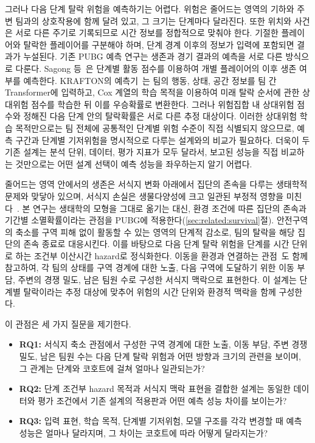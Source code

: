 그러나 다음 단계 탈락 위험을 예측하기는 어렵다.
위험은 줄어드는 영역의 기하와 주변 팀과의 상호작용에 함께 달려 있고, 그 크기는 단계마다 달라진다.
또한 위치와 사건은 서로 다른 주기로 기록되므로 시간 정보를 정합적으로 맞춰야 한다.
기절한 플레이어와 탈락한 플레이어를 구분해야 하며, 단계 경계 이후의 정보가 입력에 포함되면 결과가 누설된다.
기존 PUBG 예측 연구는 생존과 경기 결과의 예측을 서로 다른 방식으로 다룬다.
Sagong 등~\cite{Sagong25a,Sagong25b}은 단계별 활동 점수를 이용하여 개별 플레이어의 이후 생존 여부를 예측한다.
KRAFTON의 예측기~\cite{KRAFTON}는 팀의 행동, 상태, 공간 정보를 팀 간 Transformer에 입력하고, Cox 계열의 학습 목적을 이용하여 미래 탈락 순서에 관한 상대위험 점수를 학습한 뒤 이를 우승확률로 변환한다.
그러나 위험집합 내 상대위험 점수와 정해진 다음 단계 안의 탈락확률은 서로 다른 추정 대상이다.
이러한 상대위험 학습 목적만으로는 팀 전체에 공통적인 단계별 위험 수준이 직접 식별되지 않으므로, 예측 구간과 단계별 기저위험을 명시적으로 다루는 설계와의 비교가 필요하다.
더욱이 두 기존 설계는 분석 단위, 데이터, 평가 지표가 모두 달라서, 보고된 성능을 직접 비교하는 것만으로는 어떤 설계 선택이 예측 성능을 좌우하는지 알기 어렵다.

줄어드는 영역 안에서의 생존은 서식지 변화 아래에서 집단의 존속을 다루는 생태학적 문제와 맞닿아 있으며, 서식지 손실은 생물다양성에 크고 일관된 부정적 영향을 미친다~\cite{Fahrig03}.
본 연구는 생태학의 모형을 그대로 옮기는 대신, 환경 조건에 따른 집단의 존속과 기간별 소멸확률이라는 관점을 PUBG에 적용한다(\ref{sec:related:survival}절).
안전구역의 축소를 구역 피해 없이 활동할 수 있는 영역의 단계적 감소로, 팀의 탈락을 해당 집단의 존속 종료로 대응시킨다.
이를 바탕으로 다음 단계 탈락 위험을 단계를 시간 단위로 하는 조건부 이산시간 hazard로 정식화한다.
이동을 환경과 연결하는 관점~\cite{Nathan08}도 함께 참고하여, 각 팀의 상태를 구역 경계에 대한 노출, 다음 구역에 도달하기 위한 이동 부담, 주변의 경쟁 밀도, 남은 팀원 수로 구성한 서식지 맥락으로 표현한다.
이 설계는 단계별 탈락이라는 추정 대상에 맞추어 위험의 시간 단위와 환경적 맥락을 함께 구성한다.

이 관점은 세 가지 질문을 제기한다.
\begin{itemize}
    \item \textbf{RQ1:}
    서식지 축소 관점에서 구성한 구역 경계에 대한 노출, 이동 부담, 주변 경쟁 밀도, 남은 팀원 수는 다음 단계 탈락 위험과 어떤 방향과 크기의 관련을 보이며, 그 관계는 단계와 코호트에 걸쳐 얼마나 일관되는가?

    \item \textbf{RQ2:}
    단계 조건부 hazard 목적과 서식지 맥락 표현을 결합한 설계는 동일한 데이터와 평가 조건에서 기존 설계의 적용판과 어떤 예측 성능 차이를 보이는가?

    \item \textbf{RQ3:}
    입력 표현, 학습 목적, 단계별 기저위험, 모델 구조를 각각 변경할 때 예측 성능은 얼마나 달라지며, 그 차이는 코호트에 따라 어떻게 달라지는가?
\end{itemize}


